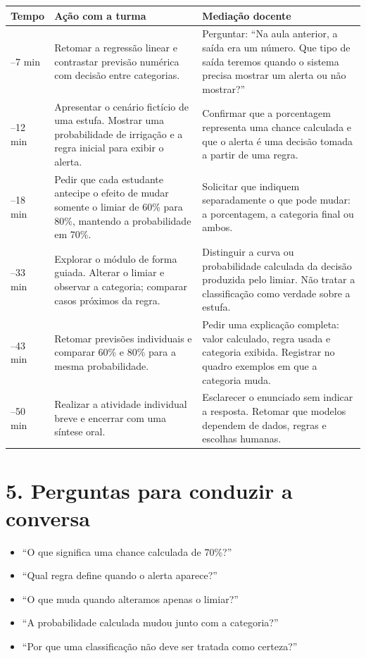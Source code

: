 \documentclass[12pt,a4paper]{article}
\begin{document}
\renewcommand{\arraystretch}{1.22}
\begin{tabularx}{\linewidth}{|>{\centering\arraybackslash}p{1.65cm}|p{5.0cm}|X|}
\hline
\textbf{Tempo} & \textbf{Ação com a turma} & \textbf{Mediação docente} \\
\hline
0--7 min & Retomar a regressão linear e contrastar previsão numérica com decisão entre categorias. & Perguntar: ``Na aula anterior, a saída era um número. Que tipo de saída teremos quando o sistema precisa mostrar um alerta ou não mostrar?'' \\
\hline
7--12 min & Apresentar o cenário fictício de uma estufa. Mostrar uma probabilidade de irrigação e a regra inicial para exibir o alerta. & Confirmar que a porcentagem representa uma chance calculada e que o alerta é uma decisão tomada a partir de uma regra. \\
\hline
12--18 min & Pedir que cada estudante antecipe o efeito de mudar somente o limiar de 60\% para 80\%, mantendo a probabilidade em 70\%. & Solicitar que indiquem separadamente o que pode mudar: a porcentagem, a categoria final ou ambos. \\
\hline
18--33 min & Explorar o módulo de forma guiada. Alterar o limiar e observar a categoria; comparar casos próximos da regra. & Distinguir a curva ou probabilidade calculada da decisão produzida pelo limiar. Não tratar a classificação como verdade sobre a estufa. \\
\hline
33--43 min & Retomar previsões individuais e comparar 60\% e 80\% para a mesma probabilidade. & Pedir uma explicação completa: valor calculado, regra usada e categoria exibida. Registrar no quadro exemplos em que a categoria muda. \\
\hline
43--50 min & Realizar a atividade individual breve e encerrar com uma síntese oral. & Esclarecer o enunciado sem indicar a resposta. Retomar que modelos dependem de dados, regras e escolhas humanas. \\
\hline
\end{tabularx}

\section*{5. Perguntas para conduzir a conversa}

\begin{itemize}
  \item ``O que significa uma chance calculada de 70\%?''
  \item ``Qual regra define quando o alerta aparece?''
  \item ``O que muda quando alteramos apenas o limiar?''
  \item ``A probabilidade calculada mudou junto com a categoria?''
  \item ``Por que uma classificação não deve ser tratada como certeza?''
\end{itemize}
\end{document}
